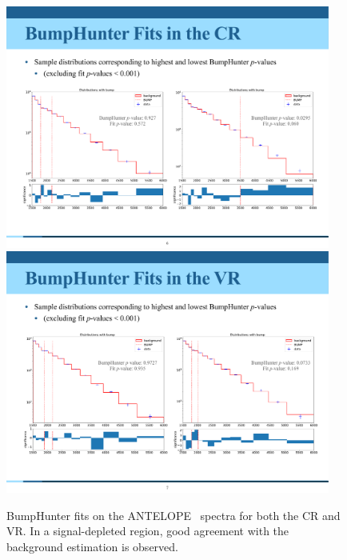 \begin{figure}[!htbp]
\centering
   \includegraphics[width=0.95\textwidth]{figures/stats/antelope_bh_cr}
   \includegraphics[width=0.95\textwidth]{figures/stats/antelope_bh_vr}
    \caption{BumpHunter fits on the ANTELOPE \mt~spectra for both the CR and VR. In a signal-depleted region, good agreement with the background estimation is observed.
    \label{fig:antelope_bh_crvr}}
\end{figure}

